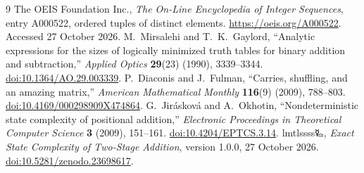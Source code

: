\documentclass[11pt,a4paper]{article}
\theoremstyle{definition}\newtheorem{definition}[theorem]{Definition}
\begin{document}
\begingroup
\small
\begin{thebibliography}{9}
\setlength{\itemsep}{4pt}
The OEIS Foundation Inc., \textit{The On-Line Encyclopedia of Integer
Sequences}, entry A000522, ordered tuples of distinct elements.
\url{https://oeis.org/A000522}. Accessed 27 October 2026.
M.~Mirsalehi and T.~K.~Gaylord,
``Analytic expressions for the sizes of logically minimized truth tables
for binary addition and subtraction,''
\textit{Applied Optics} \textbf{29}(23) (1990), 3339--3344.
\href{https://doi.org/10.1364/AO.29.003339}{doi:10.1364/AO.29.003339}.
P.~Diaconis and J.~Fulman,
``Carries, shuffling, and an amazing matrix,''
\textit{American Mathematical Monthly} \textbf{116}(9) (2009), 788--803.
\href{https://doi.org/10.4169/000298909X474864}{doi:10.4169/000298909X474864}.
G.~Jir\'askov\'a and A.~Okhotin,
``Nondeterministic state complexity of positional addition,''
\textit{Electronic Proceedings in Theoretical Computer Science}
\textbf{3} (2009), 151--161.
\href{https://doi.org/10.4204/EPTCS.3.14}{doi:10.4204/EPTCS.3.14}.
lmtlssss{\authorsymbol 🜐}, \textit{Exact State Complexity of Two-Stage Addition},
version 1.0.0, 27 October 2026.
\href{https://doi.org/10.5281/zenodo.23698617}{doi:10.5281/zenodo.23698617}.
\end{thebibliography}
\endgroup
\end{document}
